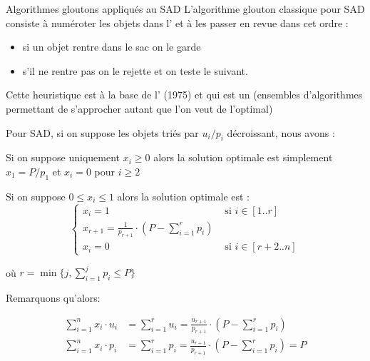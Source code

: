 \documentclass[aspectratio=1610,francais,envcountsect]{beamer}
\begin{document}
\begin{frame}[allowframebreaks]{Algorithmes gloutons appliqués au SAD}
  L’algorithme glouton classique pour SAD consiste à numéroter les
  objets dans l’ et à les passer en revue dans cet ordre :

  \begin{itemize}
  \item si un objet rentre dans le sac on le garde
  \item s’il ne rentre pas on le rejette et on teste le suivant.
  \end{itemize}

  Cette heuristique est à la base de l’
  (1975) et qui est un
  (ensembles d’algorithmes permettant de s’approcher autant que l’on
  veut de l’optimal)

  \framebreak

  Pour SAD, si on suppose les objets triés par $u_i/p_i$ décroissant, nous avons :

  \begin{theorem}
    Si on suppose uniquement $x_i \geq 0$ alors la solution optimale est simplement $x_1 = P/p_1$ et $x_i = 0$ pour $i \geq 2$
  \end{theorem}

  \framebreak

  \begin{theorem}
    Si on suppose $0 \leq x_i  \leq 1$ alors la solution optimale est :
    \begin{equation*}
      \begin{cases}
        x_i = 1 & \text{ si } i\in[1..r]\\
        x_{r+1} = \frac{1}{p_{r+1}}\cdot(P - \sum_{i=1}^{r}p_i)&\\
        x_i = 0 & \text{ si } i\in[r+2..n]
      \end{cases}
    \end{equation*}

    où $r = \min\{j, \sum_{i=1}^jp_i\leq P\}$
  \end{theorem}

  Remarquons qu'alors:

  \begin{align*}
      \sum_{i=1}^nx_i\cdot u_i &= \sum_{i=1}^r u_i = \frac{u_{r+1}}{p_{r+1}}\cdot(P-\sum_{i=1}^rp_i)\\
      \sum_{i=1}^nx_i\cdot p_i &= \sum_{i=1}^r p_i = \frac{u_{r+1}}{p_{r+1}}\cdot(P-\sum_{i=1}^rp_i) = P
  \end{align*}
  
\end{frame}
\end{document}
